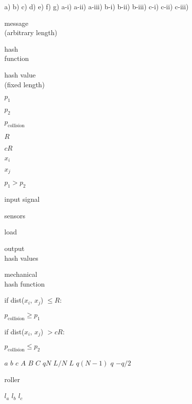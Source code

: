 \documentclass[a4paper,10pt]{article}
\begin{document}
\sffamily 


a) b) c) d) e) f) g) a-i) a-ii) a-iii) b-i) b-ii) b-iii) c-i) c-ii) c-iii)

\begin{center}
message\\
\vspace{-1mm}
(arbitrary length)
\end{center}

\begin{center}
hash\\
\vspace{-1mm}
function
\end{center}

\begin{center}
hash value\\
\vspace{-1mm}
(fixed length)
\end{center}

$p_1$

$p_2$

$p_{\mathrm{collision}}$

$R$

$cR$

$x_i$

$x_j$

$p_1 > p_2$

input signal

sensors

load

\begin{center}
output\\
\vspace{-1mm}
hash values
\end{center}

\begin{center}
mechanical\\
\vspace{-1mm}
hash function
\end{center}

\noindent if dist($x_i$, $x_j$) $\leq R$:

$p_{\mathrm{collision}} \geq p_1$


\noindent if dist($x_i$, $x_j$) $> cR$:

$p_{\mathrm{collision}} \leq p_2$

\bigskip

$a$ $b$ $c$ $A$ $B$ $C$ $qN$ $L/N$ $L$ $q(N-1)$ $q$ $-q/2$ 

roller


$l_a$ $l_b$ $l_c$



%
%
\end{document}
